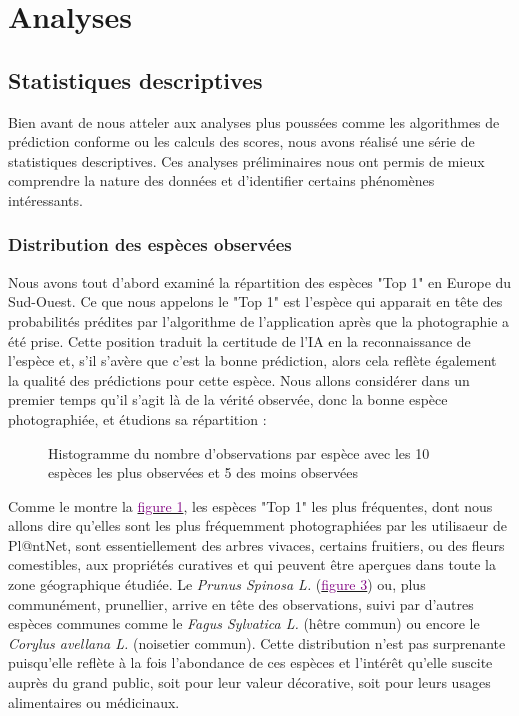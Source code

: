 \documentclass[a4paper,12pt]{article}
\begin{document}

\section{Analyses}


\subsection{Statistiques descriptives}

Bien avant de nous atteler aux analyses plus poussées comme les algorithmes de prédiction conforme ou les calculs des scores, nous avons réalisé une série de statistiques descriptives. Ces analyses préliminaires nous ont permis de mieux comprendre la nature des données et d'identifier certains phénomènes intéressants.

\subsubsection{Distribution des espèces observées}

Nous avons tout d'abord examiné la répartition des espèces "Top 1" en Europe du Sud-Ouest. Ce que nous appelons le "Top 1" est l'espèce qui apparait en tête des probabilités prédites par l'algorithme de l'application après que la photographie a été prise. Cette position traduit la certitude de l'IA en la reconnaissance de l'espèce et, s'il s'avère que c'est la bonne prédiction, alors cela reflète également la qualité des prédictions pour cette espèce. Nous allons considérer dans un premier temps qu'il s'agit là de la vérité observée, donc la bonne espèce photographiée, et étudions sa répartition :

\begin{figure}[H]
    \centering
    
    \caption{Histogramme du nombre d'observations par espèce avec les 10 espèces les plus observées et 5 des moins observées}
    \label{fig1}
\end{figure}

Comme le montre la \hyperref[fig1]{\textcolor{purple}{figure 1}}, les espèces "Top 1" les plus fréquentes, dont nous allons dire qu'elles sont les plus fréquemment photographiées par les utilisaeur de Pl@ntNet, sont essentiellement des arbres vivaces, certains fruitiers, ou des fleurs comestibles, aux propriétés curatives et qui peuvent être aperçues dans toute la zone géographique étudiée. Le \textit{Prunus Spinosa L.} (\hyperref[fig:prunus]{\textcolor{purple}{figure 3}}) ou, plus communément, prunellier, arrive en tête des observations, suivi par d'autres espèces communes comme le \textit{Fagus Sylvatica L.} (hêtre commun) ou encore le \textit{Corylus avellana L.} (noisetier commun). Cette distribution n'est pas surprenante puisqu'elle reflète à la fois l'abondance de ces espèces et l'intérêt qu'elle suscite auprès du grand public, soit pour leur valeur décorative, soit pour leurs usages alimentaires ou médicinaux.
\end{document}
